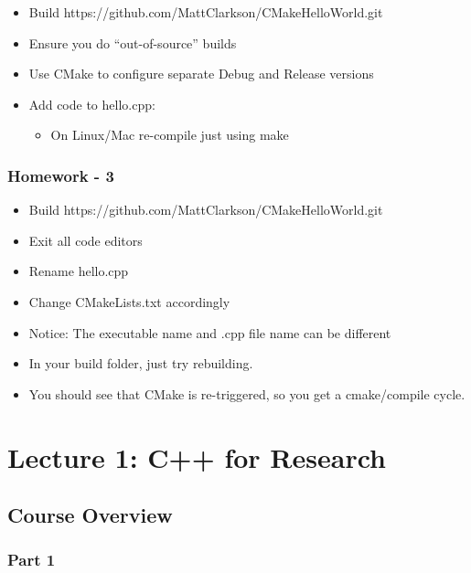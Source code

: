\begin{itemize}
\tightlist
\item
  Build https://github.com/MattClarkson/CMakeHelloWorld.git
\item
  Ensure you do ``out-of-source'' builds
\item
  Use CMake to configure separate Debug and Release versions
\item
  Add code to hello.cpp:

  \begin{itemize}
  \tightlist
  \item
    On Linux/Mac re-compile just using make
  \end{itemize}
\end{itemize}

\hypertarget{homework---3}{%
\subsubsection{Homework - 3}\label{homework---3}}

\begin{itemize}
\tightlist
\item
  Build https://github.com/MattClarkson/CMakeHelloWorld.git
\item
  Exit all code editors
\item
  Rename hello.cpp
\item
  Change CMakeLists.txt accordingly
\item
  Notice: The executable name and .cpp file name can be different
\item
  In your build folder, just try rebuilding.
\item
  You should see that CMake is re-triggered, so you get a cmake/compile
  cycle.
\end{itemize}

\hypertarget{lecture-1-c-for-research}{%
\section{Lecture 1: C++ for Research}\label{lecture-1-c-for-research}}

\hypertarget{course-overview}{%
\subsection{Course Overview}\label{course-overview}}

\hypertarget{part-1}{%
\subsubsection{Part 1}\label{part-1}}

